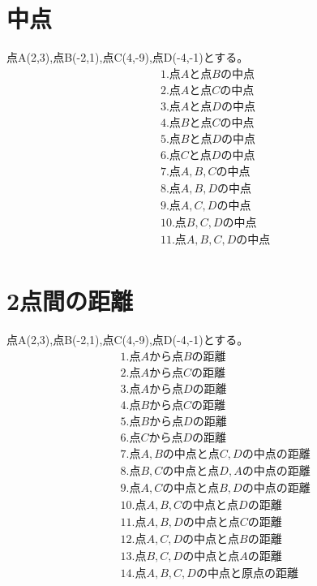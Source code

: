 \documentclass[paper=b4j,landscape,twocolumn,fleqn]{jlreq}
\begin{document}
\section{中点}
点A(2,3),点B(-2,1),点C(4,-9),点D(-4,-1)とする。
\begin{align*}
　&1.　点Aと点Bの中点\\
　&2.　点Aと点Cの中点\\
　&3.　点Aと点Dの中点\\
　&4.　点Bと点Cの中点\\
　&5.　点Bと点Dの中点\\
　&6.　点Cと点Dの中点\\
　&7.　点A,B,Cの中点\\
　&8.　点A,B,Dの中点\\
　&9.　点A,C,Dの中点\\
　&10.　点B,C,Dの中点\\
　&11.　点A,B,C,Dの中点\\
\end{align*}
\section{2点間の距離}
点A(2,3),点B(-2,1),点C(4,-9),点D(-4,-1)とする。
\begin{align*}
　&1.　点Aから点Bの距離\\
　&2.　点Aから点Cの距離\\
　&3.　点Aから点Dの距離\\
　&4.　点Bから点Cの距離\\
　&5.　点Bから点Dの距離\\
　&6.　点Cから点Dの距離\\
　&7.　点A,Bの中点と点C,Dの中点の距離\\
　&8.　点B,Cの中点と点D,Aの中点の距離\\
　&9.　点A,Cの中点と点B,Dの中点の距離\\
　&10.　点A,B,Cの中点と点Dの距離\\
　&11.　点A,B,Dの中点と点Cの距離\\
　&12.　点A,C,Dの中点と点Bの距離\\
　&13.　点B,C,Dの中点と点Aの距離\\
　&14.　点A,B,C,Dの中点と原点の距離\\
\end{align*}

\newpage
\end{document}
